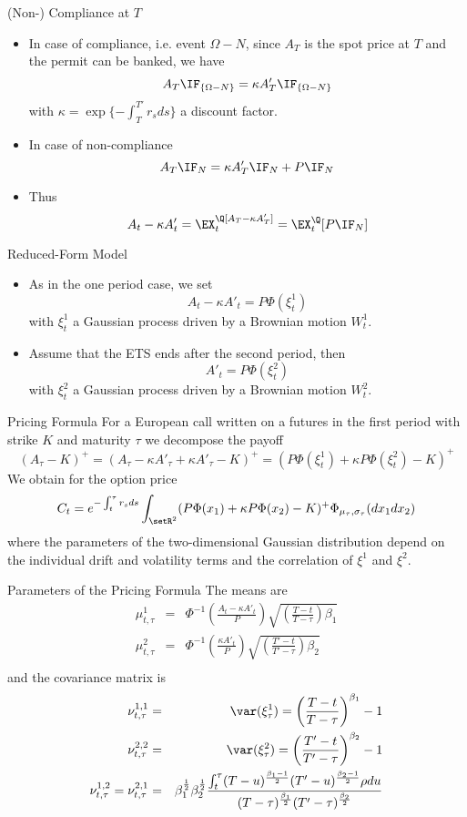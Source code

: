 {(Non-) Compliance at $T$}
\begin{itemize}
\item<1-> In case of compliance, i.e. event $\Omega-N$, since $A_T$ is the spot price at $T$ and the permit can be banked,  we have
$$
A_T\IF_{\{\Omega-N\}}= \kappa A'_T \IF_{\{\Omega-N\}}
$$
with $\kappa= \exp\{-\int_T^{T'}r_s ds\}$ a discount factor.
\item<2-> In case of non-compliance
$$
A_T\IF_{N}= \kappa A'_T \IF_{N} + P\IF_N
$$
\item<3-> Thus
$$
A_t-\kappa A'_t = \EX_t^\Q[A_T-\kappa A'_T]= \EX^\Q_t[P \IF_N]
$$
\end{itemize}



{Reduced-Form Model}
\begin{itemize}
\item<1-> As in the one period case,  we set
$$
A_t-\kappa A'_t = P \Phi(\xi_t^1)
$$
with $\xi^1_t$ a Gaussian process driven by a Brownian motion $W^1_t$.
\item<2-> Assume that the ETS ends after the second period, then
$$
A'_t = P \Phi(\xi^2_t)
$$
with $\xi^2_t$ a Gaussian process driven by a Brownian motion $W^2_t$.
\end{itemize}


{Pricing Formula}
For a European call written on a futures in the first period with strike $K$ and maturity $\tau$ we decompose the payoff
$$
(A_\tau-K)^+= (A_\tau - \kappa A'_\tau + \kappa A'_\tau -K )^+= (P\Phi(\xi^1_t) + \kappa P \Phi(\xi_t^2) -K)^+
$$
We obtain for the option price
$$
C_t = e^{-\int_t^\tau r_s ds} \int_{\setR^2} (P\Phi(x_1)+\kappa P \Phi(x_2) -K)^+ \Phi_{\mu_\tau, \sigma_\tau}(dx_1dx_2)
$$
where the parameters of the two-dimensional Gaussian distribution depend on the individual drift and volatility terms and the correlation
of $\xi^1$ and $\xi^2$.




{Parameters of the Pricing Formula}
The means are
\begin{eqnarray}\nonumber
\mu^1_{t,\tau} &=& \Phi^{-1}\left(\frac{A_t - \kappa A'_t}{P}\right) \sqrt{\left(\frac{T-t}{T-\tau}\right)\beta_1}\\\nonumber
\mu^2_{t,\tau} &=& \Phi^{-1}\left(\frac{\kappa A'_t}{P}\right) \sqrt{\left(\frac{T'-t}{T'-\tau}\right)\beta_2}\\\nonumber
\end{eqnarray}
and the covariance matrix is
\begin{eqnarray}\nonumber
\nu^{1,1}_{t,\tau} &=& \var(\xi_\tau^1) =  \left(\frac{T-t}{T-\tau}\right)^{\beta_1}-1\\\nonumber
\nu^{2,2}_{t,\tau} &=& \var(\xi_\tau^2) =  \left(\frac{T'-t}{T'-\tau}\right)^{\beta_2}-1\\\nonumber
\nu^{1,2}_{t,\tau}= \nu^{2,1}_{t,\tau} &=& \beta_1^\frac{1}{2}\beta_2^\frac{1}{2}
\frac{\int_t^\tau (T-u)^\frac{\beta_1-1}{2} (T'-u)^\frac{\beta_2-1}{2} \rho du}{(T-\tau)^\frac{\beta_1}{2} (T'-\tau)^\frac{\beta_2}{2}} \\\nonumber
\end{eqnarray}


